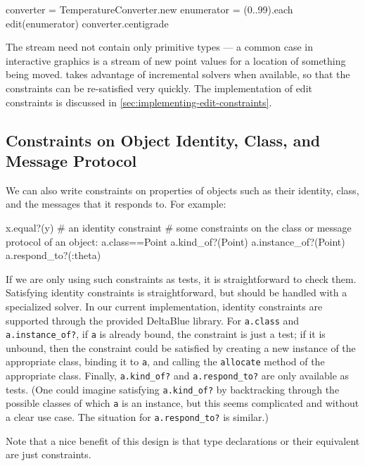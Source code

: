 \begin{code}
converter = TemperatureConverter.new
enumerator = (0..99).each
edit(enumerator) {converter.centigrade}
\end{code}

The stream need not contain only primitive types --- a common case in
interactive graphics is a stream of new point values for a location of
something being moved.  \toolname takes advantage of incremental
solvers when available, so that the constraints can be re-satisfied
very quickly.  The implementation of edit constraints is discussed in
\autoref{sec:implementing-edit-constraints}.

\subsection{Constraints on Object Identity, Class, and Message Protocol}

We can also write constraints on properties of objects such as their
identity, class, and the messages that it responds to.  For example:

\begin{code}
x.equal?(y)  # an identity constraint
# some constraints on the class or message protocol of an object:
a.class==Point  
a.kind_of?(Point)
a.instance_of?(Point)
a.respond_to?(:theta)
\end{code}

If we are only using such constraints as tests, it is straightforward
to check them. Satisfying identity constraints is straightforward, but
should be handled with a specialized solver. In our current
implementation, identity constraints are supported through the
provided DeltaBlue library. For \lstinline{a.class} and
\lstinline{a.instance_of?}, if \lstinline{a} is already bound, the
constraint is just a test; if it is unbound, then the constraint could
be satisfied by creating a new instance of the appropriate class,
binding it to \lstinline{a}, and calling the \lstinline{allocate}
method of the appropriate class.  Finally, \lstinline{a.kind_of?}  and
\lstinline{a.respond_to?} are only available as tests.  (One could
imagine satisfying \lstinline{a.kind_of?} by backtracking through the
possible classes of which \lstinline{a} is an instance, but this seems
complicated and without a clear use case.  The situation for
\lstinline{a.respond_to?}  is similar.)

Note that a nice benefit of this design is that type declarations or
their equivalent are just constraints.

